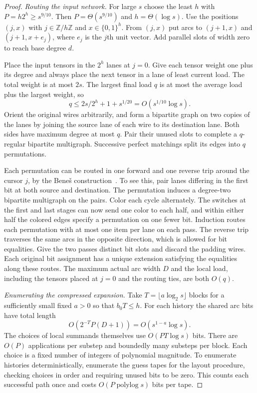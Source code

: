 \begin{proof}
\emph{Routing the input network.}
For large $s$ choose the least $h$ with $P=h2^h\ge s^{9/10}$.
Then $P=\Theta(s^{9/10})$ and $h=\Theta(\log s)$. Use the positions
$(j,x)$ with $j\in\mathbb Z/h\mathbb Z$ and $x\in\{0,1\}^h$. From
$(j,x)$ put arcs to $(j+1,x)$ and $(j+1,x+e_j)$, where $e_j$ is the $j$th unit
vector. Add parallel slots of width zero to reach base degree $d$.

Place the input tensors in the $2^h$ lanes at $j=0$. Give each
tensor weight one plus its degree and always place the next tensor
in a lane of least current load. The total weight is at most $2s$.
The largest final load $q$ is at most the average load plus the
largest weight, so
\[
       q\le 2s/2^h+1+s^{1/20}=O(s^{1/10}\log s).
\]
Orient the original wires arbitrarily, and form a bipartite graph on
two copies of the lanes by joining the source lane of each wire to
its destination lane. Both sides have maximum degree at most $q$.
Pair their unused slots to complete a $q$-regular bipartite
multigraph. Successive perfect matchings split its edges into $q$
permutations.

Each permutation can be routed in one forward and one reverse trip
around the cursor $j$, by the Bene\v s construction~\cite{Benes}.
To see this, pair lanes differing in the first bit at both source
and destination. The permutation induces a degree-two bipartite
multigraph on the pairs. Color each cycle alternately. The switches
at the first and last stages can now send one color to each half, and
within either half the colored edges specify a permutation on one
fewer bit. Induction routes each permutation with at most one item
per lane on each pass. The reverse trip traverses the same arcs in
the opposite direction, which is allowed for bit equalities. Give
the two passes distinct bit slots and discard the padding wires.
Each original bit assignment has a unique extension satisfying the
equalities along these routes.
The maximum actual arc width $D$ and the local load, including the
tensors placed at $j=0$ and the routing ties, are both $O(q)$.

\emph{Enumerating the compressed expansion.}
Take $T=\lfloor a\log_2 s\rfloor$ blocks for a sufficiently small
fixed $a>0$ so that $b_0T\le h$. For each history the shared arc
bits have total length
\[
        O(2^{-T}P(D+1))=O(s^{1-a}\log s).
\]
The choices of local summands themselves use $O(PT\log s)$ bits.
There are $O(P)$ applications per substep and boundedly many substeps
per block. Each choice is a fixed number of integers of polynomial
magnitude. To enumerate histories deterministically, enumerate
the guess tapes for the layout procedure, checking choices in order
and requiring unused bits to be zero. This counts each successful
path once and costs $O(P\operatorname{polylog}s)$ bits per tape.


\end{proof}
